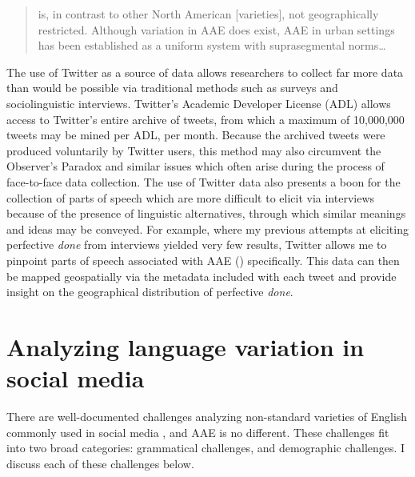 \documentclass[output=paper,draftmode,colorlinks,citecolor=brown]{langscibook}
\begin{document}
\begin{quote}
\sloppy\relax
[AAE] is, in contrast to other North American [varieties], not geographically restricted. Although variation in AAE does exist, AAE in urban settings has been established as a uniform system with suprasegmental norms… \citep[10]{JørgensenHovySøgaard2015}
\end{quote}

The use of Twitter as a source of data allows researchers to collect far more data than would be possible via traditional methods such as surveys and sociolinguistic interviews. Twitter’s Academic Developer License (ADL) allows access to Twitter’s entire archive of tweets, from which a maximum of 10,000,000 tweets may be mined per ADL, per month. Because the archived tweets were produced voluntarily by Twitter users, this method may also circumvent the Observer's Paradox \citep{Labov1972} and similar issues which often arise during the process of face-to-face data collection. The use of Twitter data also presents a boon for the collection of parts of speech which are more difficult to elicit via interviews because of the presence of linguistic alternatives, through which similar meanings and ideas may be conveyed. For example, where my previous attempts at eliciting perfective \textit{done} from interviews yielded very few results, Twitter allows me to pinpoint parts of speech associated with AAE (\citealt{Green2002, Rickford1999}) specifically. This data can then be mapped geospatially via the metadata included with each tweet and provide insight on the geographical distribution of perfective \textit{done}.

\section{Analyzing language variation in social media}
\label{sec:baxter:2}
There are well-documented challenges analyzing non-standard varieties of English commonly used in social media \citep{plank-etal-2016-multilingual}, and AAE is no different. These challenges fit into two broad categories: grammatical challenges, and demographic challenges. I discuss each of these challenges below.
\end{document}
